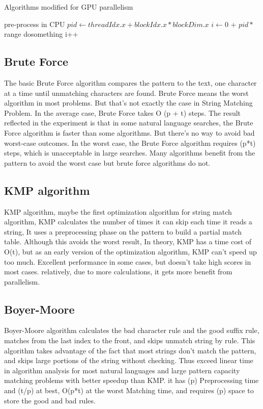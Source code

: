 \documentclass[11pt]{article}       %
\begin{document}
\begin{algorithm}[hbt!]
\caption{Algorithms modified for GPU parallelism}\label{gpuSlice}
pre-process in CPU\;
$pid \gets threadIdx.x + blockIdx.x * blockDim.x$
$i \gets 0$ + $pid * $range\;
   { 
  dosomething
  i++\;
 }
\end{algorithm}



\subsection{Brute Force}\label{bf}
The basic Brute Force algorithm compares the pattern to the text, one character at a time until unmatching characters are found. Brute Force means the worst algorithm in most problems. But that's not exactly the case in String Matching Problem. In the average case, Brute Force takes O (p + t) steps. The result reflected in the experiment is that in some natural language searches, the Brute Force algorithm is faster than some algorithms. But there's no way to avoid bad worst-case outcomes. In the worst case, the Brute Force algorithm requires (p*t) steps, which is unacceptable in large searches. Many algorithms benefit from the pattern to avoid the worst case but brute force algorithms do not.

\subsection{KMP algorithm}\label{kmp}
KMP algorithm, maybe the first optimization algorithm\cite{KMP} for string match algorithm, KMP calculates the number of times it can skip each time it reads a string, It uses a preprocessing phase on the pattern to build a partial match table. Although this avoids the worst result, In theory, KMP has a time cost of O(t), but as an early version of the optimization algorithm, KMP can’t speed up too much. Excellent performance in some cases, but doesn’t take high scores in most cases. relatively, due to more calculations, it gets more benefit from parallelism.

\subsection{Boyer-Moore}\label{bm}
Boyer-Moore algorithm calculates the bad character rule and the good suffix rule\cite{BM}, matches from the last index to the front, and skips unmatch string by rule. This algorithm takes advantage of the fact that most strings don’t match the pattern, and skips large portions of the string without checking. Thus exceed linear time in algorithm analysis for most natural languages and large pattern capacity matching problems with better speedup than KMP. it has (p) Preprocessing time and  (t/p) at best, O(p*t) at the worst Matching time, and requires (p) space to store the good and bad rules.
\end{document}
